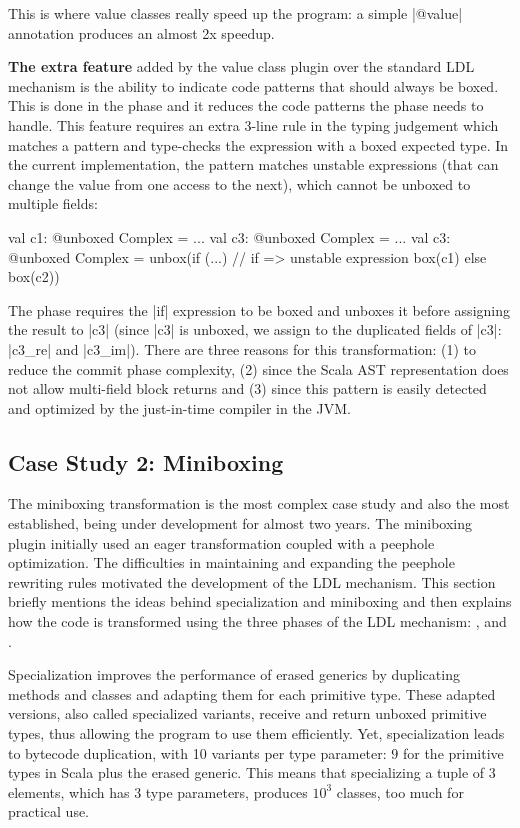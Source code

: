 This is where value classes really speed up the program: a simple |@value| annotation produces an almost 2x speedup.

\textbf{The extra feature} added by the value class plugin over the standard LDL mechanism is the ability to indicate code patterns that should always be boxed. This is done in the \coerce{} phase and it reduces the code patterns the \commit{} phase needs to handle. This feature requires an extra 3-line rule in the typing judgement which matches a pattern and type-checks the expression with a boxed expected type. In the current implementation, the pattern matches unstable expressions (that can change the value from one access to the next), which cannot be unboxed to multiple fields:

\begin{lstlisting-nobreak}
 val c1: @unboxed Complex = ...
 val c3: @unboxed Complex = ...
 val c3: @unboxed Complex =
   unbox(if (...) // if => unstable expression
             box(c1)
           else
             box(c2))
\end{lstlisting-nobreak}

The \coerce{} phase requires the |if| expression to be boxed and unboxes it before assigning the result to |c3| (since |c3| is unboxed, we assign to the duplicated fields of |c3|: |c3_re| and |c3_im|). There are three reasons for this transformation: (1) to reduce the commit phase complexity, (2) since the Scala AST representation does not allow multi-field block returns and (3) since this pattern is easily detected and optimized by the just-in-time compiler in the JVM.


\subsection{Case Study 2: Miniboxing}
\label{sec:validation/miniboxing}
The miniboxing transformation \cite{miniboxing, miniboxing-www} is the most complex case study and also the most established, being under development for almost two years. The miniboxing plugin initially used an eager transformation coupled with a peephole optimization. The difficulties in maintaining and expanding the peephole rewriting rules motivated the development of the LDL mechanism. This section briefly mentions the ideas behind specialization and miniboxing and then explains how the code is transformed using the three phases of the LDL mechanism: \inject{}, \coerce{} and \commit{}.

Specialization \cite{iuli-thesis} improves the performance of erased generics by duplicating methods and classes and adapting them for each primitive type. These adapted versions, also called specialized variants, receive and return unboxed primitive types, thus allowing the program to use them efficiently. Yet, specialization leads to bytecode duplication, with 10 variants per type parameter: $9$ for the primitive types in Scala plus the erased generic. This means that specializing a tuple of 3 elements, which has $3$ type parameters, produces $10^3$ classes, too much for practical use.

